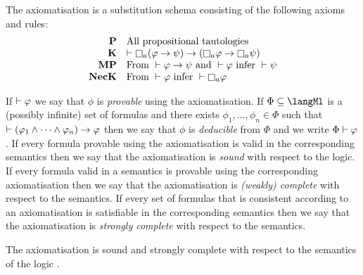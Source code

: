 \begin{definition}
The axiomatisation \axiomK{} is a substitution schema consisting of the following axioms and rules:
$$
\begin{array}{rl}
    {\bf P}     & \text{All propositional tautologies}\\
    {\bf K}     & \proves \necessary[\agentA] (\phi \implies \psi) \implies (\necessary[\agentA] \phi \implies \necessary[\agentA] \psi)\\
    {\bf MP}    & \text{From } \proves \phi \implies \psi \text{ and } \proves \phi \text{ infer } \proves \psi\\
    {\bf NecK}  & \text{From } \proves \phi \text{ infer } \proves \necessary[\agentA] \phi
\end{array}
$$
\end{definition}

If $\vdash \varphi$ we say that $\phi$ is {\em provable} using the axiomatisation.
If $\Phi \subseteq \langMl$ is a (possibly infinite) set of formulas and there exists $\phi_1, \dots, \phi_n \in \Phi$ such that $\vdash (\varphi_1 \land \cdots \land \varphi_n) \rightarrow \varphi$ then we say that $\phi$ is {\em deducible} from $\Phi$ and we write $\Phi \vdash \varphi$.
If every formula provable using the axiomatisation is valid in the corresponding semantics then we say that the axiomatisation is {\em sound} with respect to the logic.
If every formula valid in a semantics is provable using the corresponding axiomatisation then we say that the axiomatisation is {\em (weakly) complete} with respect to the semantics.
If every set of formulas that is consistent according to an axiomatisation is satisfiable in the corresponding semantics then we say that the axiomatisation is {\em strongly complete} with respect to the semantics.

\begin{proposition}
The axiomatisation \axiomK{} is sound and strongly complete with respect to the semantics of the logic \logicK{}.
\end{proposition}

